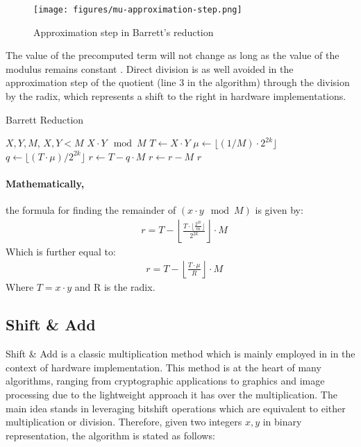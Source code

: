 \documentclass[11pt,
  titlepage=false,
  abstract=on,
]{scrreprt}
\begin{document}
\begin{figure}[h]
  \centering
  \texttt{[image: figures/mu-approximation-step.png]}
  \caption{Approximation step in Barrett's reduction \cite{ModArith}}
  \label{fig:ApproximationStepBarrett}
\end{figure}
\newpage
The value of the precomputed term will not change as long as the value of the modulus remains constant \cite{4272869}.
Direct division is as well avoided in the approximation step of the quotient (line 3 in the algorithm) through the division by the radix, which represents a shift to the right in hardware implementations.

\begin{algorithm}
  \caption{Barrett Reduction}
  \label{alg:montgomery}
  \begin{algorithmic}[1]
  \REQUIRE \( X, Y, M \), \( X, Y < M \)
  \renewcommand{\algorithmicensure}{\textbf{Output:}}
  \ENSURE \(X \cdot Y \mod M \)
  \STATE \( T \leftarrow X \cdot Y \)
  \STATE \( \mu \leftarrow \lfloor(1 / M) \cdot 2^{2k}\rfloor \)
  \STATE \( q \leftarrow \lfloor (T \cdot \mu) / 2^{2k} \rfloor \)
  \STATE \( r \leftarrow T - q \cdot M \)
      \STATE \( r \leftarrow r - M \)
  \ENDIF
  \RETURN \( r \)
  \end{algorithmic}
\end{algorithm}
\paragraph{Mathematically,} the formula for finding the remainder of $(x \cdot y \mod M)$ is given by:
\begin{align*}
  &r = T - \left\lfloor \frac{T \cdot \lfloor \frac{2^{2k}}{m}\rfloor}{2^{2k}} \right\rfloor \cdot M
\end{align*}
Which is further equal to:
\begin{align*}
  &r = T - \left\lfloor \frac{T \cdot \mu}{R} \right\rfloor \cdot M
\end{align*}
Where $T = x \cdot y$ and R is the radix.

\subsection{Shift \& Add}
Shift \& Add is a classic multiplication method which is mainly employed in in the context of hardware implementation.
This method is at the heart of many algorithms, ranging from cryptographic applications to graphics and image processing due to the lightweight
approach it has over the multiplication. The main idea stands in leveraging bitshift operations which are equivalent to either multiplication or division.
Therefore, given two integers $x, y$ in binary representation, the algorithm is stated as follows:
\end{document}
